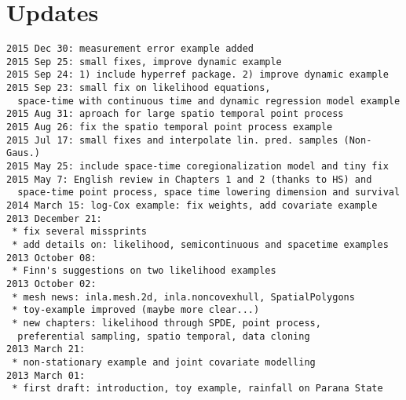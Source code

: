 \section{Updates}
\begin{verbatim}
2015 Dec 30: measurement error example added 
2015 Sep 25: small fixes, improve dynamic example
2015 Sep 24: 1) include hyperref package. 2) improve dynamic example
2015 Sep 23: small fix on likelihood equations, 
  space-time with continuous time and dynamic regression model example
2015 Aug 31: aproach for large spatio temporal point process 
2015 Aug 26: fix the spatio temporal point process example  
2015 Jul 17: small fixes and interpolate lin. pred. samples (Non-Gaus.)
2015 May 25: include space-time coregionalization model and tiny fix
2015 May 7: English review in Chapters 1 and 2 (thanks to HS) and 
  space-time point process, space time lowering dimension and survival
2014 March 15: log-Cox example: fix weights, add covariate example
2013 December 21: 
 * fix several missprints
 * add details on: likelihood, semicontinuous and spacetime examples 
2013 October 08: 
 * Finn's suggestions on two likelihood examples 
2013 October 02:
 * mesh news: inla.mesh.2d, inla.noncovexhull, SpatialPolygons 
 * toy-example improved (maybe more clear...) 
 * new chapters: likelihood through SPDE, point process, 
  preferential sampling, spatio temporal, data cloning
2013 March 21:
 * non-stationary example and joint covariate modelling
2013 March 01: 
 * first draft: introduction, toy example, rainfall on Parana State
\end{verbatim}
